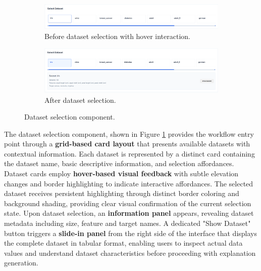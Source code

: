 \begin{figure}[htbp]
    \centering
    \begin{subfigure}[c]{\textwidth}
        \centering
        \includegraphics[width=\textwidth]{images/datasetSelectionComponentBefore.png}
        \caption{Before dataset selection with hover interaction.}
    \end{subfigure}
    \vfill
    \begin{subfigure}[c]{\textwidth}
        \centering
        \includegraphics[width=\textwidth]{images/datasetSelectionComponentAfter.png}
        \caption{After dataset selection.}
    \end{subfigure}

    \caption{Dataset selection component.}
    \label{fig:datasetSelectionInterface}
\end{figure}

The dataset selection component, shown in Figure \ref{fig:datasetSelectionInterface} provides the workflow entry point through a \textbf{grid-based card layout} that presents available datasets with contextual information. Each dataset is represented by a distinct card containing the dataset name, basic descriptive information, and selection affordances.
%
Dataset cards employ \textbf{hover-based visual feedback} with subtle elevation changes and border highlighting to indicate interactive affordances. The selected dataset receives persistent highlighting through distinct border coloring and background shading, providing clear visual confirmation of the current selection state.
% 
Upon dataset selection, an \textbf{information panel} appears, revealing dataset metadata including size, feature and target names. A dedicated "Show Dataset" button triggers a \textbf{slide-in panel} from the right side of the interface that displays the complete dataset in tabular format, enabling users to inspect actual data values and understand dataset characteristics before proceeding with explanation generation.

